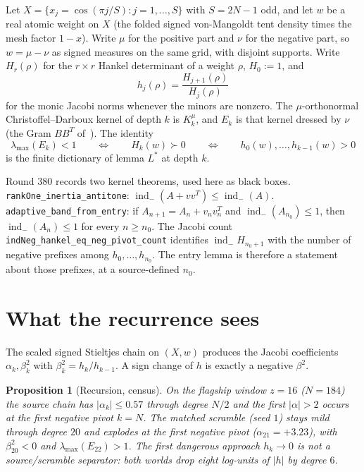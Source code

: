 \documentclass[11pt]{article}
\newtheorem{prop}{Proposition}
\theoremstyle{remark}
\newcommand{\indm}{\operatorname{ind}_{-}}
\begin{document}
Let $X=\{x_j=\cos(\pi j/S):j=1,\ldots,S\}$ with $S=2N-1$ odd, and
let $w$ be a real atomic weight on $X$ (the folded signed
von-Mangoldt tent density times the mesh factor $1-x$).  Write
$\mu$ for the positive part and $\nu$ for the negative part, so
$w=\mu-\nu$ as signed measures on the same grid, with disjoint
supports.  Write $H_r(\rho)$ for the $r\times r$ Hankel determinant
of a weight $\rho$, $H_0:=1$, and
\[
h_j(\rho)=\frac{H_{j+1}(\rho)}{H_j(\rho)}
\]
for the monic Jacobi norms whenever the minors are nonzero.  The
$\mu$-orthonormal Christoffel--Darboux kernel of depth $k$ is
$K_k^\mu$, and $E_k$ is that kernel dressed by $\nu$ (the Gram
$B B^T$ of~\cite{r283,r285}).  The identity
\[
\lambda_{\max}(E_k)<1
\qquad\Longleftrightarrow\qquad
H_k(w)\succ 0
\qquad\Longleftrightarrow\qquad
h_0(w),\ldots,h_{k-1}(w)>0
\]
is the finite dictionary of lemma $L^*$ at depth $k$.

Round 380 records two kernel theorems, used here as black boxes.
\texttt{rankOne\_inertia\_antitone}: $\indm(A+vv^T)\le\indm(A)$.
\texttt{adaptive\_band\_from\_entry}: if $A_{n+1}=A_n+v_n v_n^T$
and $\indm(A_{n_0})\le 1$, then $\indm(A_n)\le 1$ for every
$n\ge n_0$.  The Jacobi count
\texttt{indNeg\_hankel\_eq\_neg\_pivot\_count} identifies
$\indm H_{n_0+1}$ with the number of negative prefixes among
$h_0,\ldots,h_{n_0}$.  The entry lemma is therefore a statement
about those prefixes, at a source-defined $n_0$.

\section{What the recurrence sees}\label{sec:rec}

The scaled signed Stieltjes chain on $(X,w)$ produces the Jacobi
coefficients $\alpha_k,\beta_k^2$ with $\beta_k^2=h_k/h_{k-1}$.
A sign change of $h$ is exactly a negative $\beta^2$.

\begin{prop}[Recursion, census]\label{prop:alpha}
On the flagship window $z=16$ ($N=184$) the source chain has
$\lvert\alpha_k\rvert\le 0.57$ through degree $N/2$ and the first
$\lvert\alpha\rvert>2$ occurs at the first negative pivot
$k=N$.  The matched scramble (seed $1$) stays mild through
degree $20$ and explodes at the first negative pivot
($\alpha_{21}=+3.23$), with $\beta^2_{20}<0$ and
$\lambda_{\max}(E_{22})>1$.  The first dangerous approach
$h_k\to 0$ is not a source/scramble separator: both worlds drop
eight log-units of $\lvert h\rvert$ by degree $6$.
\end{prop}
\end{document}

